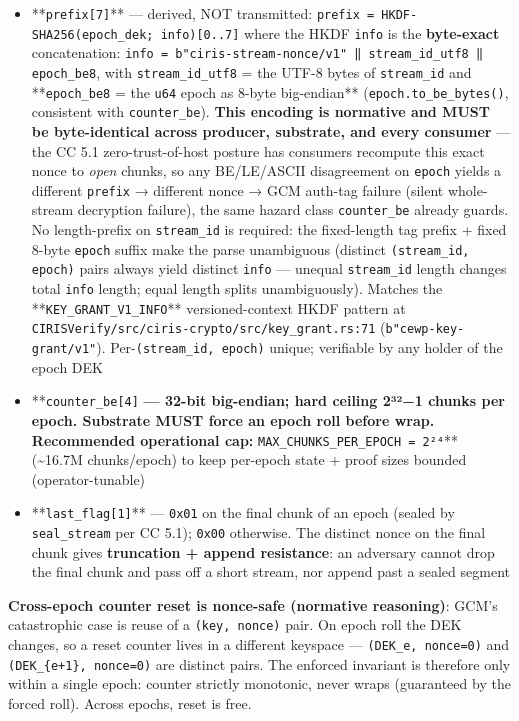 \documentclass[11pt]{article}
\begin{document}
\begin{itemize}\setlength\itemsep{0pt}
\item **\texttt{prefix[7]}** — derived, NOT transmitted: \texttt{prefix = HKDF-SHA256(epoch\_dek; info)[0..7]} where the HKDF \texttt{info} is the \textbf{byte-exact} concatenation: \texttt{info = b"ciris-stream-nonce/v1" ‖ stream\_id\_utf8 ‖ epoch\_be8}, with \texttt{stream\_id\_utf8} = the UTF-8 bytes of \texttt{stream\_id} and **\texttt{epoch\_be8} = the \texttt{u64} epoch as 8-byte big-endian** (\texttt{epoch.to\_be\_bytes()}, consistent with \texttt{counter\_be}). \textbf{This encoding is normative and MUST be byte-identical across producer, substrate, and every consumer} — the CC 5.1 zero-trust-of-host posture has consumers recompute this exact nonce to \textit{open} chunks, so any BE/LE/ASCII disagreement on \texttt{epoch} yields a different \texttt{prefix} → different nonce → GCM auth-tag failure (silent whole-stream decryption failure), the same hazard class \texttt{counter\_be} already guards. No length-prefix on \texttt{stream\_id} is required: the fixed-length tag prefix + fixed 8-byte \texttt{epoch} suffix make the parse unambiguous (distinct \texttt{(stream\_id, epoch)} pairs always yield distinct \texttt{info} — unequal \texttt{stream\_id} length changes total \texttt{info} length; equal length splits unambiguously). Matches the **\texttt{KEY\_GRANT\_V1\_INFO}** versioned-context HKDF pattern at \texttt{CIRISVerify/src/ciris-crypto/src/key\_grant.rs:71} (\texttt{b"cewp-key-grant/v1"}). Per-\texttt{(stream\_id, epoch)} unique; verifiable by any holder of the epoch DEK
\item **\texttt{counter\_be[4]}\textbf{ — 32-bit big-endian; hard ceiling 2³²−1 chunks per epoch. Substrate MUST force an epoch roll before wrap. Recommended operational cap: }\texttt{MAX\_CHUNKS\_PER\_EPOCH = 2²⁴}** (\textasciitilde{}16.7M chunks/epoch) to keep per-epoch state + proof sizes bounded (operator-tunable)
\item **\texttt{last\_flag[1]}** — \texttt{0x01} on the final chunk of an epoch (sealed by \texttt{seal\_stream} per CC 5.1); \texttt{0x00} otherwise. The distinct nonce on the final chunk gives \textbf{truncation + append resistance}: an adversary cannot drop the final chunk and pass off a short stream, nor append past a sealed segment
\end{itemize}


\textbf{Cross-epoch counter reset is nonce-safe (normative reasoning)}: GCM's catastrophic case is reuse of a \texttt{(key, nonce)} pair. On epoch roll the DEK changes, so a reset counter lives in a different keyspace — \texttt{(DEK\_e, nonce=0)} and \texttt{(DEK\_\{e+1\}, nonce=0)} are distinct pairs. The enforced invariant is therefore only within a single epoch: counter strictly monotonic, never wraps (guaranteed by the forced roll). Across epochs, reset is free.
\end{document}
